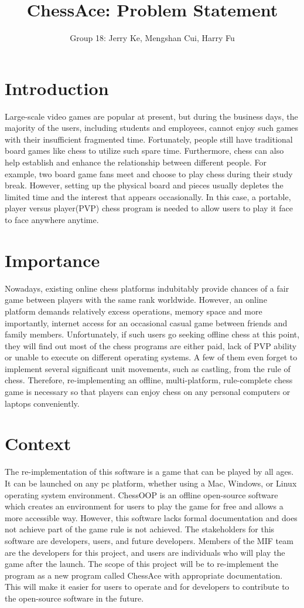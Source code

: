 \documentclass[12pt,letterpaper]{article}
\title{ChessAce: Problem Statement}
\author{Group 18: Jerry Ke, Mengshan Cui, Harry Fu}
\date{}
\begin{document}
\maketitle
\section{Introduction}
Large-scale video games are popular at present, but during the business days, the majority of the users, including students and employees, cannot enjoy such games with their insufficient fragmented time. Fortunately, people still have traditional board games like chess to utilize such spare time. Furthermore, chess can also help establish and enhance the relationship between different people. For example, two board game fans meet and choose to play chess during their study break. However, setting up the physical board and pieces usually depletes the limited time and the interest that appears occasionally. In this case, a portable, player versus player(PVP) chess program is needed to allow users to play it face to face anywhere anytime. 

\section{Importance}
Nowadays, existing online chess platforms indubitably provide chances of a fair game between players with the same rank worldwide. However, an online platform demands relatively excess operations, memory space and more importantly, internet access for an occasional casual game between friends and family members. 
Unfortunately, if such users go seeking offline chess at this point, they will find out most of the chess programs are either paid, lack of PVP ability or unable to execute on different operating systems. A few of them even forget to implement several significant unit movements, such as castling, from the rule of chess. 
Therefore, re-implementing an offline, multi-platform, rule-complete chess game is necessary so that players can enjoy chess on any personal computers or laptops conveniently. 

\section{Context}
The re-implementation of this software is a game that can be played by all ages. It can be launched on any pc platform, whether using a Mac, Windows, or Linux operating system environment. ChessOOP is an offline open-source software which creates an environment for users to play the game for free and allows a more accessible way. However, this software lacks formal documentation and does not achieve part of the game rule is not achieved. The stakeholders for this software are developers, users, and future developers. Members of the MIF team are the developers for this project, and users are individuals who will play the game after the launch. The scope of this project will be to re-implement the program as a new program called ChessAce with appropriate documentation. This will make it easier for users to operate and for developers to contribute to the open-source software in the future.

\end{document}
